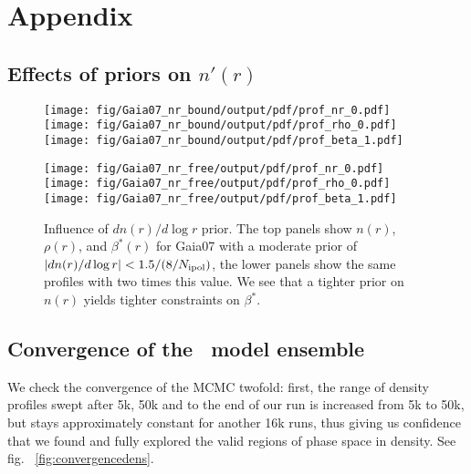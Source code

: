 \section{Appendix}
\appendix
\subsection{Effects of priors on $n'(r)$}
\begin{figure*}
  \begin{center}
    \hspace{-7mm}
    \texttt{[image: fig/Gaia07\_nr\_bound/output/pdf/prof\_nr\_0.pdf]}
    \texttt{[image: fig/Gaia07\_nr\_bound/output/pdf/prof\_rho\_0.pdf]}
    \texttt{[image: fig/Gaia07\_nr\_bound/output/pdf/prof\_beta\_1.pdf]}
  \end{center}
  \begin{center}
    \texttt{[image: fig/Gaia07\_nr\_free/output/pdf/prof\_nr\_0.pdf]}
    \texttt{[image: fig/Gaia07\_nr\_free/output/pdf/prof\_rho\_0.pdf]}
    \texttt{[image: fig/Gaia07\_nr\_free/output/pdf/prof\_beta\_1.pdf]}
  \end{center}
  \begin{center}
    \caption{Influence of $dn(r)/d\log r$ prior. The top panels show
      $n(r)$, $\rho(r)$, and $\beta^*(r)$ for Gaia07 with a moderate
      prior of $|dn(r)/d\log r|<1.5/(8/N_{\rm ipol})$, the lower
      panels show the same profiles with two times this value. We see
      that a tighter prior on $n(r)$ yields tighter constraints on $\beta^*$.}
    \label{fig:nrprime}
    \end{center}
\end{figure*}



\subsection{Convergence of the \MultiNest\ model ensemble}
We check the convergence of the MCMC twofold: first, the range of density
profiles swept after 5k, 50k and to the end of our run is increased from 5k to
50k, but stays approximately constant for another 16k runs, thus giving us
confidence that we found and fully explored the valid regions of phase space in
density. See fig. ~\ref{fig:convergencedens}.

